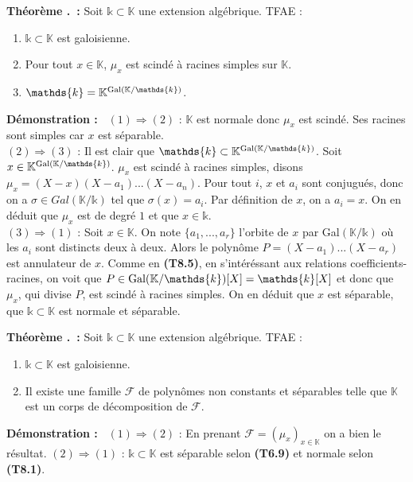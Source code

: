 \documentclass[5pt,a4paper]{article}
\newcounter{thm}[section]
\renewcommand{\thethm}{\thesection.\arabic{thm}}
\newcommand{\thmEnum}[1]{\stepcounter{thm}\noindent\textbf{Théorème \thethm ~:} #1}
\newcommand{\demo}[1]{\textbf{Démonstration :~} #1 \newline}
\begin{document}
\begin{onehalfspacing}
\thmEnum{Soit $\mathds{k} \subset \mathbb{K}$ une extension algébrique. TFAE :
	\begin{enumerate}
	\item $\mathds{k} \subset \mathbb{K}$ est galoisienne.
	\item Pour tout $x \in \mathbb{K}$, $\mu_x$ est scindé à racines simples sur $\mathbb{K}$.
	\item $\mathds{k} = \mathbb{K}^{\textup{Gal}(\mathbb{K}/\mathds{k})}$.
	\end{enumerate}
}
\demo{$(1) \Rightarrow (2)$ : $\mathbb{K}$ est normale donc $\mu_x$ est scindé. Ses racines sont simples car $x$ est séparable.\\
$(2) \Rightarrow (3)$ : Il est clair que $\mathds{k} \subset \mathbb{K}^{\textup{Gal}(\mathbb{K}/\mathds{k})}$. Soit $x \in \mathbb{K}^{\textup{Gal}(\mathbb{K}/\mathds{k})}$. $\mu_x$ est scindé à racines simples, disons $\mu_x = (X - x)(X - a_1)...(X - a_n)$. Pour tout $i$, $x$ et $a_i$ sont conjugués, donc on a $\sigma \in Gal(\mathbb{K}/\mathds{k})$ tel que $\sigma(x) = a_i$. Par définition de $x$, on a $a_i = x$. On en déduit que $\mu_x$ est de degré $1$ et que $x \in \mathds{k}$.\\
$(3) \Rightarrow (1)$ : Soit $x \in \mathbb{K}$. On note $\{a_1, ..., a_r\}$ l'orbite de $x$ par Gal$(\mathbb{K}/\mathds{k})$ où les $a_i$ sont distincts deux à deux. Alors le polynôme $P = (X - a_1)...(X - a_r)$ est annulateur de $x$. Comme en \textbf{(T8.5)}, en s'intéréssant aux relations coefficients-racines, on voit que $P \in \textup{Gal}(\mathbb{K}/\mathds{k})[X] = \mathds{k}[X]$ et donc que $\mu_x$, qui divise $P$, est scindé à racines simples. On en déduit que $x$ est séparable, que $\mathds{k} \subset \mathbb{K}$ est normale et séparable.}


\thmEnum{Soit $\mathds{k} \subset \mathbb{K}$ une extension algébrique. TFAE :
	\begin{enumerate}
	\item $\mathds{k} \subset \mathbb{K}$ est galoisienne.
	\item Il existe une famille $\mathcal{F}$ de polynômes non constants et séparables telle que $\mathbb{K}$ est un corps de décomposition de $\mathcal{F}$.
	\end{enumerate}
}
\demo{$(1) \Rightarrow (2)$ : En prenant $\mathcal{F} = (\mu_x)_{x \in \mathbb{K}}$ on a bien le résultat. $(2) \Rightarrow (1)$ : $\mathds{k} \subset \mathbb{K}$ est séparable selon \textbf{(T6.9)} et normale selon \textbf{(T8.1)}.}



\end{onehalfspacing}
\end{document}
